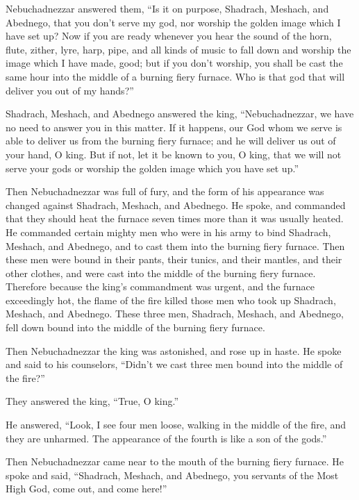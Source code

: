 {Nebuchadnezzar answered them, “Is it on purpose, Shadrach, Meshach, and Abednego, that you don’t serve my god, nor worship the golden image which I have set up?
Now if you are ready whenever you hear the sound of the horn, flute, zither, lyre, harp, pipe, and all kinds of music to fall down and worship the image which I have made, good; but if you don’t worship, you shall be cast the same hour into the middle of a burning fiery furnace. Who is that god that will deliver you out of my hands?”
\par }{\PP {}Shadrach, Meshach, and Abednego answered the king, “Nebuchadnezzar, we have no need to answer you in this matter.
If it happens, our God whom we serve is able to deliver us from the burning fiery furnace; and he will deliver us out of your hand, O king.
But if not, let it be known to you, O king, that we will not serve your gods or worship the golden image which you have set up.”
\par }{\PP {}Then Nebuchadnezzar was full of fury, and the form of his appearance was changed against Shadrach, Meshach, and Abednego. He spoke, and commanded that they should heat the furnace seven times more than it was usually heated.
He commanded certain mighty men who were in his army to bind Shadrach, Meshach, and Abednego, and to cast them into the burning fiery furnace.
Then these men were bound in their pants, their tunics, and their mantles, and their other clothes, and were cast into the middle of the burning fiery furnace.
Therefore because the king’s commandment was urgent, and the furnace exceedingly hot, the flame of the fire killed those men who took up Shadrach, Meshach, and Abednego.
These three men, Shadrach, Meshach, and Abednego, fell down bound into the middle of the burning fiery furnace.
\par }{\PP {}Then Nebuchadnezzar the king was astonished, and rose up in haste. He spoke and said to his counselors, “Didn’t we cast three men bound into the middle of the fire?”
\par }{\PP They answered the king, “True, O king.”
\par }{\PP {}He answered, “Look, I see four men loose, walking in the middle of the fire, and they are unharmed. The appearance of the fourth is like a son of the gods.”
\par }{\PP {}Then Nebuchadnezzar came near to the mouth of the burning fiery furnace. He spoke and said, “Shadrach, Meshach, and Abednego, you servants of the Most High God, come out, and come here!”
}
